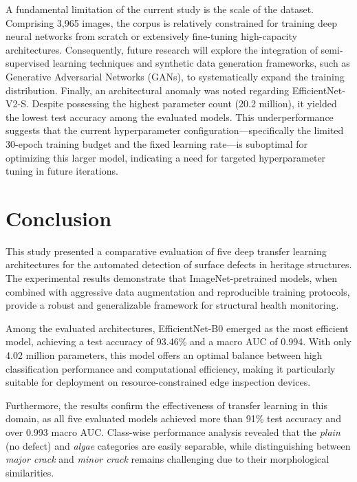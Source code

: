 \documentclass[conference]{IEEEtran}
\begin{document}
A fundamental limitation of the current study is the scale of the dataset. Comprising 3,965 images, the corpus is relatively constrained for training deep neural networks from scratch or extensively fine-tuning high-capacity architectures. Consequently, future research will explore the integration of semi-supervised learning techniques and synthetic data generation frameworks, such as Generative Adversarial Networks (GANs), to systematically expand the training distribution. Finally, an architectural anomaly was noted regarding EfficientNet-V2-S. Despite possessing the highest parameter count (20.2 million), it yielded the lowest test accuracy among the evaluated models. This underperformance suggests that the current hyperparameter configuration---specifically the limited 30-epoch training budget and the fixed learning rate---is suboptimal for optimizing this larger model, indicating a need for targeted hyperparameter tuning in future iterations.


\section{Conclusion}

This study presented a comparative evaluation of five deep transfer learning architectures for the automated detection of surface defects in heritage structures. The experimental results demonstrate that ImageNet-pretrained models, when combined with aggressive data augmentation and reproducible training protocols, provide a robust and generalizable framework for structural health monitoring.

Among the evaluated architectures, EfficientNet-B0 emerged as the most efficient model, achieving a test accuracy of 93.46\% and a macro AUC of 0.994. With only 4.02 million parameters, this model offers an optimal balance between high classification performance and computational efficiency, making it particularly suitable for deployment on resource-constrained edge inspection devices.

Furthermore, the results confirm the effectiveness of transfer learning in this domain, as all five evaluated models achieved more than 91\% test accuracy and over 0.993 macro AUC. Class-wise performance analysis revealed that the \textit{plain} (no defect) and \textit{algae} categories are easily separable, while distinguishing between \textit{major crack} and \textit{minor crack} remains challenging due to their morphological similarities.
\end{document}
